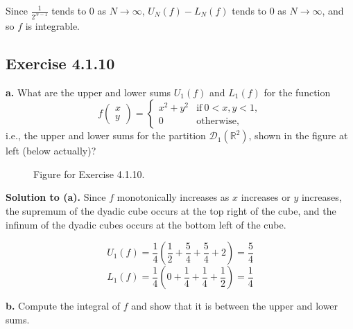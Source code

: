 \documentclass{article}
\begin{document}
Since $\frac{1}{2^{N-1}}$ tends to 0 as $N \to \infty$,
$U_N(f) - L_N(f)$ tends to 0 as $N \to \infty$,
and so $f$ is integrable.
\newpage

\subsection*{Exercise 4.1.10}

\textbf{a.} What are the upper and lower sums $U_1(f)$ and $L_1(f)$ for the function
$$f\begin{pmatrix} x\\y\end{pmatrix} = \begin{cases}
      x^2 + y^2 & \text{if}\ 0<x,y<1 , \\
      0 & \text{otherwise},
    \end{cases}$$
    i.e., the upper and lower sums for the partition $\mathcal{D}_1(\mathbb{R}^2)$, shown in the figure at
left (below actually)? 

\begin{figure}[ht!]
    \centering
{}
    \caption{Figure for Exercise 4.1.10.}
    \label{fig:my_label 1}
\end{figure}


\medskip 

\textbf{Solution to (a).}
Since $f$ monotonically increases as $x$ increases or $y$ increases,
the supremum of the dyadic cube occurs at the top right of the cube, and
the infinum of the dyadic cubes occurs at the bottom left of the cube.

\[
    U_1(f) 
    = \frac{1}{4}(\frac{1}{2} + \frac{5}{4} + \frac{5}{4} + 2)
    = \frac{5}{4}
\]
\[
    L_1(f) 
    = \frac{1}{4}(0 + \frac{1}{4} + \frac{1}{4} + \frac{1}{2})
    = \frac{1}{4}
\]

\bigskip 

\textbf{b.}  Compute the integral of $f$ and show that it is between the upper and lower sums.
\medskip 
\end{document}
